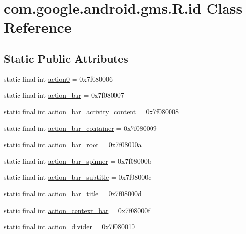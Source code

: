 \hypertarget{classcom_1_1google_1_1android_1_1gms_1_1R_1_1id}{}\section{com.\+google.\+android.\+gms.\+R.\+id Class Reference}
\label{classcom_1_1google_1_1android_1_1gms_1_1R_1_1id}
\subsection*{Static Public Attributes}
\begin{DoxyCompactItemize}
\item 
static final int \mbox{\hyperlink{classcom_1_1google_1_1android_1_1gms_1_1R_1_1id_ae54bd3ac7a3cb599ed4ae2bf9ca54221}{action0}} = 0x7f080006
\item 
static final int \mbox{\hyperlink{classcom_1_1google_1_1android_1_1gms_1_1R_1_1id_a4e6738937b0448ed080052f1d7e05c37}{action\+\_\+bar}} = 0x7f080007
\item 
static final int \mbox{\hyperlink{classcom_1_1google_1_1android_1_1gms_1_1R_1_1id_a7db94aeef9433be791978d779b1dd748}{action\+\_\+bar\+\_\+activity\+\_\+content}} = 0x7f080008
\item 
static final int \mbox{\hyperlink{classcom_1_1google_1_1android_1_1gms_1_1R_1_1id_aed3e9ada79ca3b971d6d332b26c63fbf}{action\+\_\+bar\+\_\+container}} = 0x7f080009
\item 
static final int \mbox{\hyperlink{classcom_1_1google_1_1android_1_1gms_1_1R_1_1id_a71ae2bf0243723c799a7bac93c2ec2e1}{action\+\_\+bar\+\_\+root}} = 0x7f08000a
\item 
static final int \mbox{\hyperlink{classcom_1_1google_1_1android_1_1gms_1_1R_1_1id_af9fbab85337547f243cbd811d833c4ca}{action\+\_\+bar\+\_\+spinner}} = 0x7f08000b
\item 
static final int \mbox{\hyperlink{classcom_1_1google_1_1android_1_1gms_1_1R_1_1id_ab6636b705881d47b904f89b71fd7cadb}{action\+\_\+bar\+\_\+subtitle}} = 0x7f08000c
\item 
static final int \mbox{\hyperlink{classcom_1_1google_1_1android_1_1gms_1_1R_1_1id_a70d38e184765a8c60fa71fd8e1558f17}{action\+\_\+bar\+\_\+title}} = 0x7f08000d
\item 
static final int \mbox{\hyperlink{classcom_1_1google_1_1android_1_1gms_1_1R_1_1id_aea22b3176a6724ab4a5af3299dd7d06d}{action\+\_\+context\+\_\+bar}} = 0x7f08000f
\item 
static final int \mbox{\hyperlink{classcom_1_1google_1_1android_1_1gms_1_1R_1_1id_ad1ed0596153a1542b6d95d0c87da05d3}{action\+\_\+divider}} = 0x7f080010

\end{DoxyCompactItemize}
